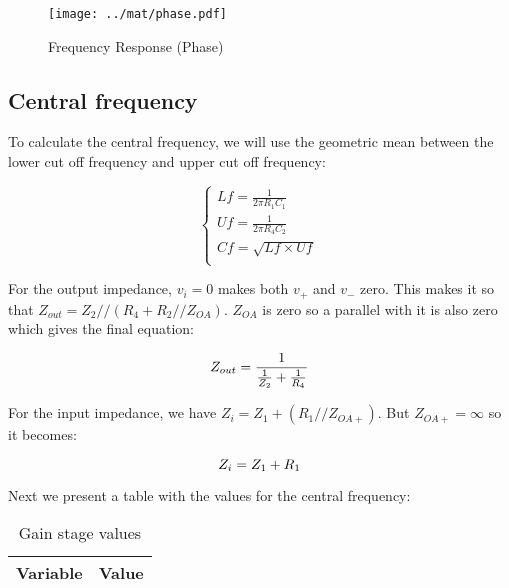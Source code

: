\par

\begin{figure}[H] \centering
\texttt{[image: ../mat/phase.pdf]}
\caption{Frequency Response (Phase)}
\label{fig:freq}
\end{figure}


\subsection{Central frequency}
To calculate the central frequency, we will use the geometric mean between the lower cut off frequency and upper cut off frequency:

\begin{equation}\label{eq:OP-AMP}
\begin{cases}
Lf=\frac{1}{2 \pi R_1 C_1}\\
Uf=\frac{1}{2 \pi R_4 C_2}\\
Cf=\sqrt{Lf \times Uf}\\
\end{cases}
\end{equation}

For the output impedance, $v_i=0$ makes both $v_+$ and $v_-$ zero. This makes it so that $Z_{out}=Z_2//(R_4 + R_2//Z_{OA})$. $Z_{OA}$ is zero so a parallel with it is also zero which gives the final equation:

\begin{equation}\label{eq:z_o}
Z_{out}=\frac{1}{\frac{1}{Z_2} + \frac{1}{R_4}}\\
\end{equation}

For the input impedance, we have $Z_i= Z_1+(R_1//Z_{OA+})$. But $Z_{OA+}=\infty$ so it becomes:

\begin{equation}\label{eq:z_o}
Z_i=Z_1 + R_1\\
\end{equation}

Next we present a table with the values for the central frequency:


\begin{table}[H]
  \centering
  \begin{tabular}{|l|r|}
    \hline    
    {\bf Variable} & {\bf Value} \\ \hline
    
  \end{tabular}
  \caption{Gain stage values}
  \label{tab:sim1}
\end{table}



